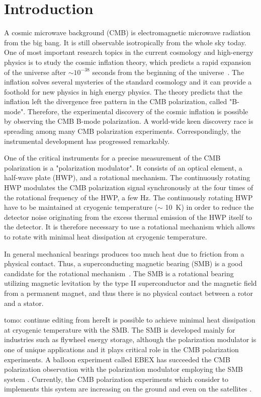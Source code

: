 \documentclass[a4paper]{jpconf}
\newcommand{\cred}[1]{{\color{red}#1}}
\begin{document}
\section*{Introduction}

A cosmic microwave background (CMB) is electromagnetic microwave radiation from the big bang.
It is still observable isotropically from the whole sky today.
One of most important research topics in the current cosmology and high-energy physics is to study the cosmic inflation theory, which predicts a rapid expansion of the universe after $\sim 10^{-38}$ seconds from the beginning of the universe~\cite{inflation_sato,inflation_guth}.
The inflation solves several mysteries of the standard cosmology and it can provide a foothold for new physics in high energy physics.
The theory predicts that the inflation left the divergence free pattern in the CMB polarization,  called "B-mode".
Therefore, the experimental discovery of the cosmic inflation is possible by observing the CMB B-mode polarization.
A world-wide keen discovery race is spreading among many CMB polarization experiments.
Correspondingly, the instrumental development has progressed remarkably.

One of the critical instruments for a precise measurement of the CMB polarization is a "polarization modulator".
It consists of an optical element, a half-wave plate (HWP), and a rotational mechanism.
The continuously rotating HWP modulates the CMB polarization signal synchronously at the four times of the rotational frequency of the HWP, a few Hz.
The continuously rotating HWP have to be maintained at cryogenic temperature ($\sim$ 10~K) in order to reduce the detector noise originating from the excess thermal emission of the HWP itself to the detector.
It is therefore necessary to use a rotational mechanism which allows to rotate with minimal heat dissipation at cryogenic temperature.

In general mechanical bearings produces too much heat due to friction from a physical contact.
Thus, a superconducting magnetic bearing (SMB) is a good candidate for the rotational mechanism~\cite{smb}.
The SMB is a rotational bearing utilizing magnetic levitation by the type II superconductor and the magnetic field from a permanent magnet, and thus there is no physical contact between a rotor and a stator.

\cred{tomo: continue editing from here}It is possible to achieve minimal heat dissipation at cryogenic temperature with the SMB.
The SMB is developed mainly for industries such as flywheel energy storage,
although the polarization modulator is one of unique applications and it plays critical role in the CMB polarization experiments.
A balloon experiment called EBEX has succeeded the CMB polarization observation with the polarization modulator employing the SMB system \cite{ebex}.
Currently, the CMB polarization experiments which consider to implements this system are increasing on the ground and even on the satellites \cite{litebird}.
\end{document}
